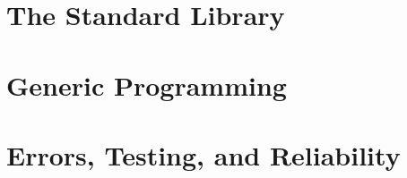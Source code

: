 

\part{The Standard Library}





































\part{Generic Programming}























\part{Errors, Testing, and Reliability}

